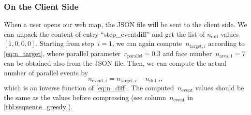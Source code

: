\documentclass[ijgi,article,submit,moreauthors,pdftex]{Definitions/mdpi}
\begin{document}



\subsubsection{On the Client Side}
\label{sec:snap_client}


When a user opens our web map,
the JSON file will be sent to the client side.
We can unpack the content of entry ``step\_eventdiff'' and 
get the list of $n_\mathrm{diff}$ values~$[1, 0, 0, 0]$.
Starting from step~$i=1$,
we can again compute~$n_{\mathrm{target},i}$ according to \eq\ref{eq:n_target},
where parallel parameter~$r_\mathrm{parallel}=0.3$ 
and face number~$n_{\mathrm{area},1} = 7$
can be obtained also from the JSON file.
Then, we can compute the actual number of parallel events by
\begin{equation*}
\label{eq:n_event_step}
n_{\mathrm{event},i} = n_{\mathrm{target},i} - n_{\mathrm{diff},i},
\end{equation*}
which is an inverse function of \eq\ref{eq:n_diff}.
The computed~$n_\mathrm{event}$ values 
should be the same as the values before compressing
(see column~$n_\mathrm{event}$ in \tbl\ref{tbl:sequence_greedy}).
\end{document}
